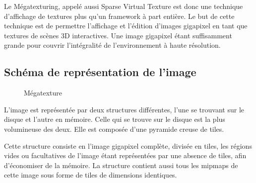 		Le Mégatexturing, appelé aussi Sparse Virtual Texture est donc une technique d'affichage de textures plus qu'un framework à part entière. Le but de 
		cette technique est de permettre l'affichage et l'édition d'images gigapixel en tant que textures de scènes 3D interactives. Une image gigapixel
		étant suffisamment grande  pour couvrir l'intégralité de l'environnement à haute résolution.

		\subsection{Schéma de représentation de l'image}
			\begin{figure}[h]
				\centering
				\caption{Mégatexture}
				\label{fig:editmegatex}
			\end{figure}
		L'image est représentée par deux structures différentes, l'une se trouvant sur le disque et l'autre en mémoire.
		Celle qui se trouve sur le disque est la plus volumineuse des deux. Elle est composée d'une pyramide creuse de tiles. 

		Cette structure consiste en l'image gigapixel complète, divisée en tiles, les régions vides ou facultatives de l'image étant représentées par une absence
		de tiles, afin d'économiser de la mémoire. La structure contient aussi tous les mipmaps de cette image sous forme de tiles de dimensions identiques.

